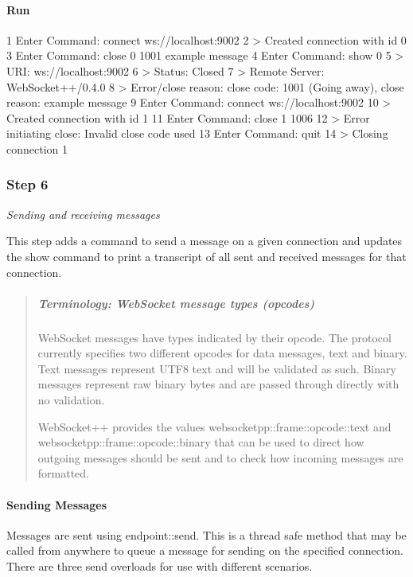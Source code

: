 \paragraph*{Run}


\begin{DoxyCode}
1 Enter Command: connect ws://localhost:9002
2 > Created connection with id 0
3 Enter Command: close 0 1001 example message
4 Enter Command: show 0
5 > URI: ws://localhost:9002
6 > Status: Closed
7 > Remote Server: WebSocket++/0.4.0
8 > Error/close reason: close code: 1001 (Going away), close reason:  example message
9 Enter Command: connect ws://localhost:9002
10 > Created connection with id 1
11 Enter Command: close 1 1006
12 > Error initiating close: Invalid close code used
13 Enter Command: quit
14 > Closing connection 1
\end{DoxyCode}


\subsubsection*{Step 6}

{\itshape Sending and receiving messages}

This step adds a command to send a message on a given connection and updates the show command to print a transcript of all sent and received messages for that connection.

\begin{quote}
\subparagraph*{Terminology\+: Web\+Socket message types (opcodes)}

Web\+Socket messages have types indicated by their opcode. The protocol currently specifies two different opcodes for data messages, text and binary. Text messages represent U\+T\+F8 text and will be validated as such. Binary messages represent raw binary bytes and are passed through directly with no validation.

Web\+Socket++ provides the values {\ttfamily websocketpp\+::frame\+::opcode\+::text} and {\ttfamily websocketpp\+::frame\+::opcode\+::binary} that can be used to direct how outgoing messages should be sent and to check how incoming messages are formatted. \end{quote}


\paragraph*{Sending Messages}

Messages are sent using {\ttfamily endpoint\+::send}. This is a thread safe method that may be called from anywhere to queue a message for sending on the specified connection. There are three send overloads for use with different scenarios.

